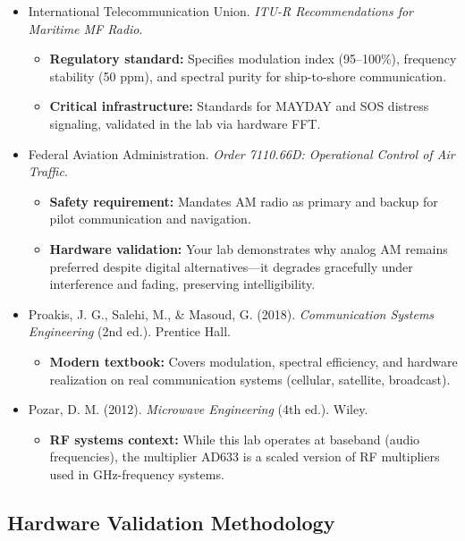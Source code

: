 \documentclass[11pt,letterpaper]{article}
\begin{document}
\begin{itemize}
    \item International Telecommunication Union. \textit{ITU-R Recommendations for Maritime MF Radio}.
    \begin{itemize}
        \item \textbf{Regulatory standard:} Specifies modulation index (95--100\%), frequency stability (50 ppm), and spectral purity for ship-to-shore communication.
        \item \textbf{Critical infrastructure:} Standards for MAYDAY and SOS distress signaling, validated in the lab via hardware FFT.
    \end{itemize}

    \item Federal Aviation Administration. \textit{Order 7110.66D: Operational Control of Air Traffic}.
    \begin{itemize}
        \item \textbf{Safety requirement:} Mandates AM radio as primary and backup for pilot communication and navigation.
        \item \textbf{Hardware validation:} Your lab demonstrates why analog AM remains preferred despite digital alternatives—it degrades gracefully under interference and fading, preserving intelligibility.
    \end{itemize}

    \item Proakis, J. G., Salehi, M., \& Masoud, G. (2018). \textit{Communication Systems Engineering} (2nd ed.). Prentice Hall.
    \begin{itemize}
        \item \textbf{Modern textbook:} Covers modulation, spectral efficiency, and hardware realization on real communication systems (cellular, satellite, broadcast).
    \end{itemize}

    \item Pozar, D. M. (2012). \textit{Microwave Engineering} (4th ed.). Wiley.
    \begin{itemize}
        \item \textbf{RF systems context:} While this lab operates at baseband (audio frequencies), the multiplier AD633 is a scaled version of RF multipliers used in GHz-frequency systems.
    \end{itemize}
\end{itemize}

\subsection*{Hardware Validation Methodology}
\end{document}
